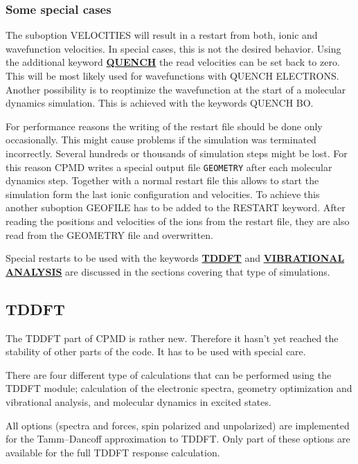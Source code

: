 \documentclass[twoside,10pt,titlepage,a4paper]{article}
\newcommand{\referto}[2]{\hyperlink{#1}{#2}}
\newcommand{\referto}[2]{\htmlref{#2}{#1}}
\newcommand{\refkeyword}[1]{%
\referto{#1}{\textbf{#1}}%
\index{#1}%
}%
\begin{document}
\subsubsection{Some special cases}

  The suboption VELOCITIES will result in a restart from both, ionic and
wavefunction velocities. In special cases, this is not the desired behavior.
Using the additional keyword \refkeyword{QUENCH} the read velocities can be set
back to zero. This will be most likely used for wavefunctions with QUENCH
ELECTRONS. Another possibility is to reoptimize the wavefunction at the start
of a molecular dynamics simulation. This is achieved with the keywords QUENCH
BO.

  For performance reasons the writing of the restart file should be done only
occasionally. This might cause problems if the simulation was terminated
incorrectly. Several hundreds or thousands of simulation steps might be lost.
For this reason CPMD writes a special output file {\tt GEOMETRY} after each
molecular dynamics step. Together with a normal restart file this allows to
start the simulation form the last ionic configuration and velocities. To
achieve this another suboption GEOFILE has to be added to the RESTART keyword.
After reading the positions and velocities of the ions from the restart file,
they are also read from the GEOMETRY file and overwritten.

  Special restarts to be used with the keywords \refkeyword{TDDFT} and
\refkeyword{VIBRATIONAL ANALYSIS} are discussed in the sections covering that
type of simulations.

\subsection{TDDFT}

  The TDDFT part of CPMD is rather new. Therefore it hasn't yet reached the
stability of other parts of the code. It has to be used with special care.

  There are four different type of calculations that can be performed using
the TDDFT module; calculation of the electronic spectra, geometry optimization and
vibrational analysis, and molecular dynamics in excited states.

  All options (spectra and forces, spin polarized and unpolarized) are
implemented for the Tamm--Dancoff approximation to TDDFT. Only part of these
options are available for the full TDDFT response calculation.
\end{document}
